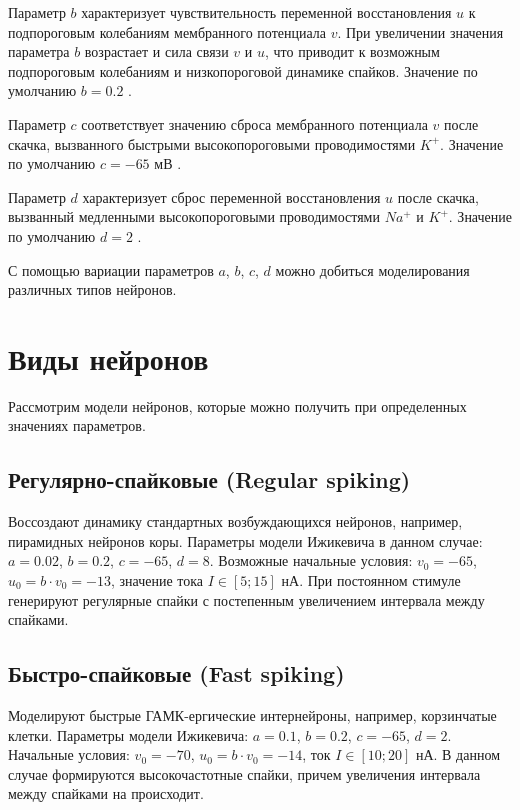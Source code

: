 Параметр $b$ характеризует чувствительность переменной восстановления $u$ к подпороговым колебаниям мембранного потенциала $v$. При увеличении значения параметра $b$ возрастает и сила связи $v$ и $u$, что приводит к возможным подпороговым колебаниям и низкопороговой динамике спайков. Значение по умолчанию $b = 0.2$ \cite{dhamo2021efficient}.

Параметр $c$ соответствует значению сброса мембранного потенциала $v$ после скачка, вызванного быстрыми высокопороговыми проводимостями $K^+$. Значение по умолчанию $c=-65$ мВ \cite{dhamo2021efficient}.

Параметр $d$ характеризует сброс переменной восстановления $u$ после скачка, вызванный медленными высокопороговыми проводимостями $Na^+$ и $K^+$. Значение по умолчанию $d=2$ \cite{dhamo2021efficient}. 

С помощью вариации параметров $a$, $b$, $c$, $d$ можно добиться моделирования различных типов нейронов.



\section{Виды нейронов}

Рассмотрим модели нейронов, которые можно получить при определенных значениях параметров.

\subsection{Регулярно-спайковые (Regular spiking)}

Воссоздают динамику стандартных возбуждающихся нейронов, например, пирамидных нейронов коры. Параметры модели Ижикевича в данном случае: $a=0.02$, $b=0.2$, $c = -65$, $d = 8$. Возможные начальные условия: $v_0 = -65$, $u_0 = b \cdot v_0 = -13$, значение тока $I \in [5; 15]$ нА. При постоянном стимуле генерируют регулярные спайки с постепенным увеличением интервала между спайками.

\subsection{Быстро-спайковые (Fast spiking)}

Моделируют быстрые ГАМК-ергические интернейроны, например, корзинчатые клетки. Параметры модели Ижикевича: $a=0.1$, $b=0.2$, $c = -65$, $d = 2$. Начальные условия: $v_0 = -70$, $u_0 = b \cdot v_0 = -14$, ток $I \in [10; 20]$ нА. В данном случае формируются высокочастотные спайки, причем увеличения интервала между спайками на происходит.


